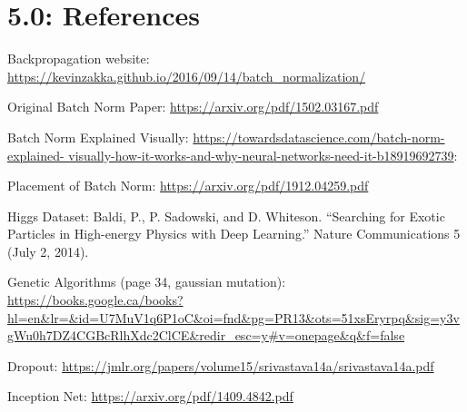 \documentclass{article}
\begin{document}
\newpage
\section*{5.0: References}













Backpropagation website:
\url{https://kevinzakka.github.io/2016/09/14/batch_normalization/}

\noindent Original Batch Norm Paper:
\url{https://arxiv.org/pdf/1502.03167.pdf}

\noindent Batch Norm Explained Visually:
\url{https://towardsdatascience.com/batch-norm-explained-
visually-how-it-works-and-why-neural-networks-need-it-b18919692739}:


\noindent Placement of Batch Norm:
\url{https://arxiv.org/pdf/1912.04259.pdf}

\noindent Higgs Dataset:
Baldi, P., P. Sadowski, and D. Whiteson. “Searching for Exotic Particles in High-energy Physics with Deep Learning.” Nature Communications 5 (July 2, 2014).

\noindent Genetic Algorithms (page 34, gaussian mutation):
\url{https://books.google.ca/books?hl=en&lr=&id=U7MuV1q6P1oC&oi=fnd&pg=PR13&ots=51xsEryrpq&sig=y3vgWu0h7DZ4CGBcRlhXdc2ClCE&redir_esc=y#v=onepage&q&f=false}

\noindent Dropout: 
\url{https://jmlr.org/papers/volume15/srivastava14a/srivastava14a.pdf}


\noindent Inception Net:
\url{https://arxiv.org/pdf/1409.4842.pdf}




\newpage
\end{document}
